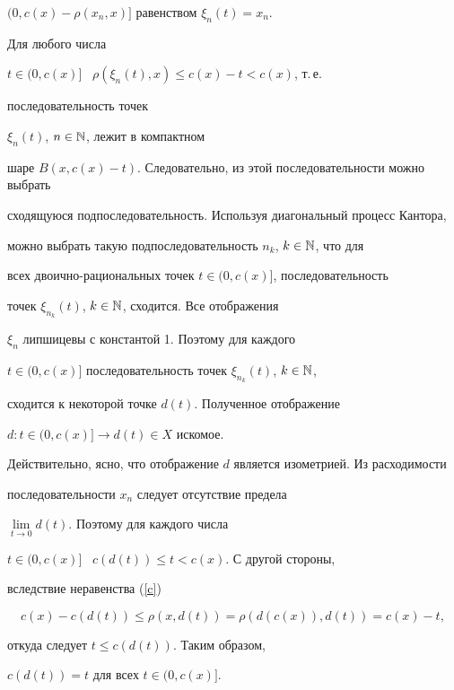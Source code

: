 \begin{pf}
$(0,c(x)-\rho(x_{n},x)]$ равенством $\xi_{n}(t)=x_{n}$.





Для любого числа


$t \in (0,c(x)]$ \ $\rho(\xi_{n}(t),x) \leq c(x)-t< c(x)$, т.\,е.


последовательность точек


$\xi_{n}(t)$, $n \in \Bbb{N}$, лежит в компактном


шаре $B(x,c(x)-t)$. Следовательно, из этой последовательности можно выбрать


сходящуюся подпоследовательность. Используя диагональный процесс Кантора,


можно выбрать такую подпоследовательность $n_{k}$, $k \in \Bbb{N}$, что для


всех двоично-рациональных точек $t \in (0,c(x)]$, последовательность


точек $\xi_{n_{k}}(t)$, $k \in \Bbb{N}$, сходится. Все отображения


$\xi_{n}$ липшицевы с константой 1. Поэтому для каждого


$t \in (0,c(x)]$ последовательность точек $\xi_{n_{k}}(t)$, $k \in \Bbb{N}$,


сходится к некоторой точке $d(t)$. Полученное отображение


$d: t \in (0,c(x)] \rightarrow d(t) \in X$ искомое.





Действительно, ясно, что отображение $d$ является изометрией. Из расходимости


последовательности $x_{n}$ следует отсутствие предела


$\lim\limits_{t\rightarrow 0}d(t)$. Поэтому для каждого числа


$t \in (0,c(x)]$ \ $c(d(t)) \leq t <c(x)$. С другой стороны,


вследствие неравенства (\ref{c})


$$


c(x)-c(d(t)) \leq \rho(x,d(t))= \rho(d(c(x)),d(t))=c(x)-t,


$$


откуда следует $t \leq c(d(t))$. Таким образом,


$c(d(t))=t$ для всех $t \in (0,c(x)]$.


\end{pf}





